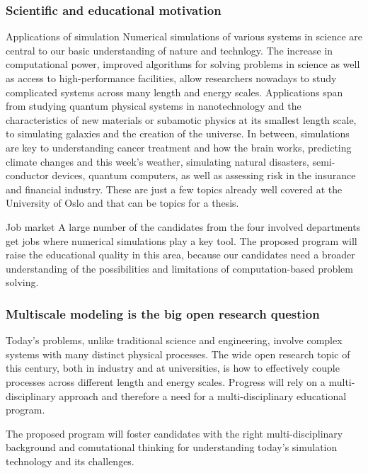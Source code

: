 \documentclass{beamer}
\begin{document}
\begin{frame}
\frametitle{Scientific and educational motivation}

\begin{block}{Applications of simulation }
Numerical simulations of various systems in science are central to our
basic understanding of nature and technlogy.
The increase in computational power,
improved algorithms for solving problems in science as well as access
to high-performance facilities, allow researchers nowadays to study
complicated systems across many length and energy scales. Applications
span from studying quantum physical systems in nanotechnology and the
characteristics of new materials or subamotic physics at its smallest
length scale, to simulating galaxies and the creation of the universe.
In between, simulations are key to understanding
cancer treatment and how the brain works,
predicting climate changes and this week's weather,
simulating natural disasters, semi-conductor devices,
quantum computers, as well as assessing risk in the insurance and
financial industry. These are just a few topics
already well covered at the University of Oslo and that can be
topics for a thesis.
\end{block}

\begin{block}{Job market }
A large number of the candidates from the four involved departments
get jobs where numerical simulations play a key tool. The proposed
program will raise the educational quality in this area, because
our candidates need a broader understanding of the possibilities
and limitations of computation-based problem solving.
\end{block}
\end{frame}

\begin{frame}
\frametitle{Multiscale modeling is the big open research question}

\begin{block}{}
Today's problems, unlike traditional
science and engineering, involve complex systems with many distinct
physical processes. The wide open research topic of this century, both
in industry and at universities, is how to effectively couple
processes across different length and energy scales. Progress will
rely on a multi-disciplinary approach and therefore a need for
a multi-disciplinary educational program.
\end{block}

\begin{block}{}
The proposed program will foster candidates with the right
multi-disciplinary background and comutational thinking for
understanding today's simulation technology and its challenges.
\end{block}
\end{frame}
\end{document}
